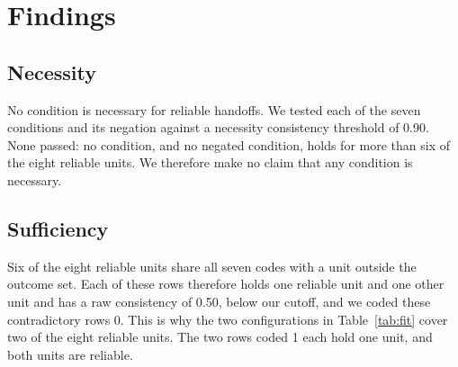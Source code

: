 \documentclass[12pt]{article}
\begin{document}
\section{Findings}

\subsection{Necessity}

No condition is necessary for reliable handoffs. We tested each of the seven conditions and its negation against a necessity consistency threshold of 0.90. None passed: no condition, and no negated condition, holds for more than six of the eight reliable units. We therefore make no claim that any condition is necessary.

\subsection{Sufficiency}

Six of the eight reliable units share all seven codes with a unit outside the outcome set. Each of these rows therefore holds one reliable unit and one other unit and has a raw consistency of 0.50, below our cutoff, and we coded these contradictory rows 0. This is why the two configurations in Table~\ref{tab:fit} cover two of the eight reliable units. The two rows coded 1 each hold one unit, and both units are reliable.
\end{document}
